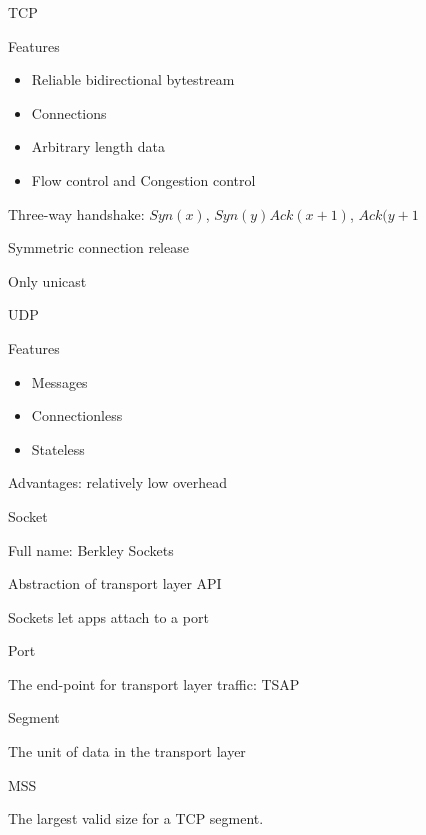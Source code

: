 \documentclass[main.tex]{subfiles}
\begin{document}
\small


\begin{card}{TCP}
\item Features
    \begin{itemize}
        \item Reliable bidirectional bytestream
        \item Connections
        \item Arbitrary length data
        \item Flow control and Congestion control
    \end{itemize}
\item Three-way handshake: $Syn(x)$, $Syn(y)Ack(x+1)$, $Ack(y+1$
\item Symmetric connection release
\item Only unicast
\end{card}

\begin{card}{UDP}
\item Features
    \begin{itemize}
        \item Messages
        \item Connectionless
        \item Stateless
    \end{itemize}
\item Advantages: relatively low overhead
\end{card}

\begin{card}{Socket}
\item Full name: Berkley Sockets
\item Abstraction of transport layer API
\item Sockets let apps attach to a port
\end{card}

\begin{card}{Port}
\item The end-point for transport layer traffic: TSAP
\end{card}

\begin{card}{Segment}
\item The unit of data in the transport layer
\end{card}

\begin{card}{MSS}
\item The largest valid size for a TCP segment.
\end{card}
\end{document}
